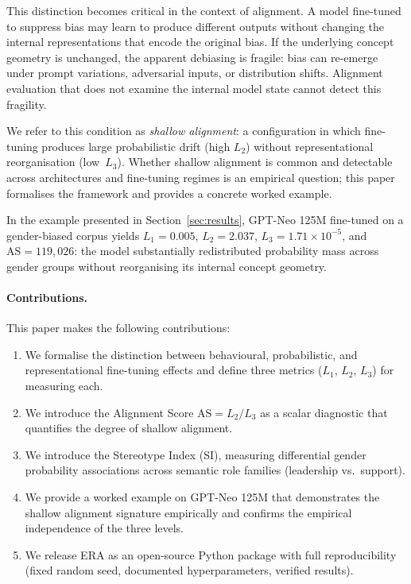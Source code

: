 \documentclass[11pt,a4paper]{article}
\begin{document}
This distinction becomes critical in the context of alignment. A model fine-tuned to suppress
bias may learn to produce different outputs without changing the internal representations
that encode the original bias. If the underlying concept geometry is unchanged, the apparent
debiasing is fragile: bias can re-emerge under prompt variations, adversarial inputs, or
distribution shifts. Alignment evaluation that does not examine the internal model state
cannot detect this fragility.

We refer to this condition as \emph{shallow alignment}: a configuration in which fine-tuning
produces large probabilistic drift (high $L_2$) without representational reorganisation
(low~$L_3$). Whether shallow alignment is common and detectable across architectures and
fine-tuning regimes is an empirical question; this paper formalises the framework and
provides a concrete worked example.

In the example presented in Section~\ref{sec:results}, GPT-Neo 125M fine-tuned on a
gender-biased corpus yields $L_1 = 0.005$, $L_2 = 2.037$, $L_3 = 1.71 \times 10^{-5}$,
and $\mathrm{AS} = 119{,}026$: the model substantially redistributed probability mass across
gender groups without reorganising its internal concept geometry.

\paragraph{Contributions.} This paper makes the following contributions:
\begin{enumerate}
  \item We formalise the distinction between behavioural, probabilistic, and representational
        fine-tuning effects and define three metrics ($L_1$, $L_2$, $L_3$) for measuring each.
  \item We introduce the Alignment Score $\mathrm{AS} = L_2 / L_3$ as a scalar diagnostic
        that quantifies the degree of shallow alignment.
  \item We introduce the Stereotype Index (SI), measuring differential gender probability
        associations across semantic role families (leadership vs.\ support).
  \item We provide a worked example on GPT-Neo 125M that demonstrates the shallow
        alignment signature empirically and confirms the empirical independence of the three levels.
  \item We release ERA as an open-source Python package with full reproducibility (fixed
        random seed, documented hyperparameters, verified results).
\end{enumerate}
\end{document}
